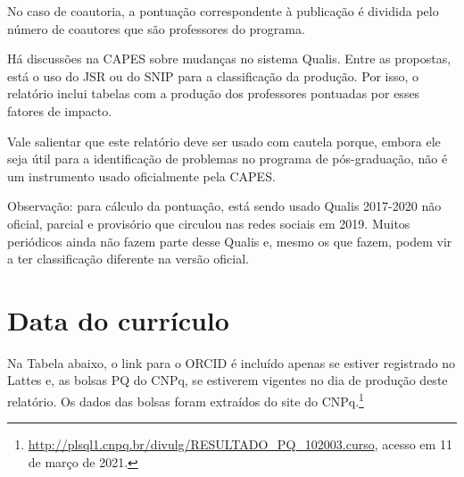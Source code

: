 \documentclass[12pt,brazil]{article}\usepackage[]{graphicx}\usepackage[]{xcolor}
\newcounter{tabela}
\begin{document}
No caso de coautoria, a pontuação correspondente à publicação é dividida pelo
número de coautores que são professores do programa.

Há discussões na CAPES sobre mudanças no sistema Qualis. Entre as propostas,
está o uso do JSR ou do SNIP para a classificação da produção. Por isso, o
relatório inclui tabelas com a produção dos professores pontuadas por esses
fatores de impacto.

Vale salientar que este relatório deve ser usado com cautela porque,
embora ele seja útil para a identificação de problemas no programa de
pós-graduação, não é um instrumento usado oficialmente pela CAPES.

Observação: para cálculo da pontuação, está sendo usado Qualis
        2017-2020 não oficial, parcial e provisório que circulou nas redes
        sociais em 2019. Muitos periódicos ainda não fazem parte desse Qualis
        e, mesmo os que fazem, podem vir a ter classificação diferente na versão
        oficial.




\clearpage

\section{Data do currículo}

Na Tabela abaixo, o link para o ORCID é incluído apenas se estiver registrado
no Lattes e, as bolsas PQ do CNPq, se estiverem vigentes no dia de produção
deste relatório. Os dados das bolsas foram extraídos do site do
CNPq.\footnote{\url{http://plsql1.cnpq.br/divulg/RESULTADO_PQ_102003.curso},
acesso em 11 de março de 2021.}
\end{document}
